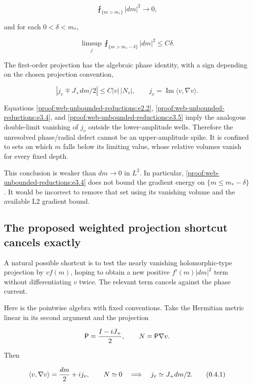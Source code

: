\[
 \fint_{\{m>m_*\}}|dm|^2\longrightarrow0,
 \tag{\thesection.3.3}\label{proof:web-unbounded-reductions:e3.3}
\]

and for each \(0<\delta<m_*\),

\[
 \boxed{\limsup_j\fint_{\{m>m_*-\delta\}}|dm|^2\le C\delta.}
 \tag{\thesection.3.4}\label{proof:web-unbounded-reductions:e3.4}
\]

The first-order projection has the algebraic phase identity, with a sign depending on the chosen projection convention,

\[
 |j_v\mp J_+dm/2|\le C|v|\,|N_v|,
 \qquad j_v=\operatorname{Im}\langle v,\nabla v\rangle.
 \tag{\thesection.3.5}\label{proof:web-unbounded-reductions:e3.5}
\]

Equations \eqref{proof:web-unbounded-reductions:e2.2}, \eqref{proof:web-unbounded-reductions:e3.4}, and \eqref{proof:web-unbounded-reductions:e3.5} imply the analogous double-limit vanishing of \(j_v\) outside the lower-amplitude wells. Therefore the unresolved phase/radial defect cannot be an upper-amplitude spike. It is confined to sets on which \(m\) falls below its limiting value, whose relative volumes vanish for every fixed depth.

This conclusion is weaker than \(dm\to0\) in \(L^2\). In particular, \eqref{proof:web-unbounded-reductions:e3.4} does not bound the gradient energy on \(\{m\le m_*-\delta\}\). It would be incorrect to remove that set using its vanishing volume and the available L2 gradient bound.

\hypertarget{proof:web-unbounded-reductions:s4}{%
\subsection{The proposed weighted projection shortcut cancels exactly}\label{proof:web-unbounded-reductions:s4}}

A natural possible shortcut is to test the nearly vanishing holomorphic-type projection by \(v f(m)\), hoping to obtain a new positive \(f'(m)|dm|^2\) term without differentiating \(v\) twice. The relevant term cancels against the phase current.

Here is the pointwise algebra with fixed conventions. Take the Hermitian metric linear in its second argument and the projection

\[
 \mathsf P={I-iJ_+\over2},\qquad N=\mathsf P\nabla v.
\]

Then

\[
 \langle v,\nabla v\rangle={dm\over2}+ij_v,
 \qquad N\simeq0\quad\Longrightarrow\quad j_v\simeq J_+dm/2.
 \tag{\thesection.4.1}\label{proof:web-unbounded-reductions:e4.1}
\]

